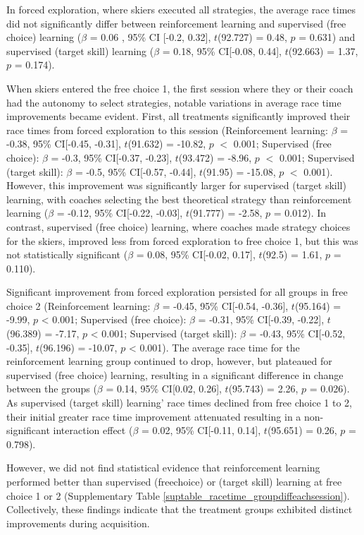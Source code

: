 \documentclass[pdflatex,sn-mathphys-num]{sn-jnl}%
\theoremstyle{thmstyleone}%
\theoremstyle{thmstyletwo}%
\theoremstyle{thmstylethree}%
\begin{document}
In forced exploration, where skiers executed all strategies, the average race times did not significantly differ between reinforcement learning and supervised (free choice) learning ($\beta$ = 0.06 , 95\% CI [-0.2, 0.32], $t$(92.727) = 0.48, $p$ = 0.631) and supervised (target skill) learning ($\beta$ = 0.18, 95\% CI[-0.08, 0.44], $t$(92.663) = 1.37, $p$ = 0.174). 

When skiers entered the free choice 1, the first session where they or their coach had the autonomy to select strategies, notable variations in average race time improvements became evident. First, all treatments significantly improved their race times from forced exploration to this session (Reinforcement learning: $\beta$ = -0.38, 95\% CI[-0.45, -0.31], $t$(91.632) = -10.82, $p$ $<$ 0.001; Supervised (free choice): $\beta$ = -0.3, 95\% CI[-0.37, -0.23], $t$(93.472) = -8.96, $p$ $<$ 0.001; Supervised (target skill): $\beta$ = -0.5, 95\% CI[-0.57, -0.44], $t$(91.95) = -15.08, $p$ $<$ 0.001). However, this improvement was significantly larger for supervised (target skill) learning, with coaches selecting the best theoretical strategy than reinforcement learning ($\beta$ = -0.12, 95\% CI[-0.22, -0.03], $t$(91.777) = -2.58, $p$ = 0.012). In contrast, supervised (free choice) learning, where coaches made strategy choices for the skiers, improved less from forced exploration to free choice 1, but this was not statistically significant ($\beta$ = 0.08, 95\% CI[-0.02, 0.17], $t$(92.5) = 1.61, $p$ = 0.110).

Significant improvement from forced exploration persisted for all groups in free choice 2 (Reinforcement learning: $\beta$ = -0.45, 95\% CI[-0.54, -0.36], $t$(95.164) = -9.99, $p$ < 0.001; Supervised (free choice): $\beta$ = -0.31, 95\% CI[-0.39, -0.22], $t$(96.389) = -7.17, $p$ < 0.001; Supervised (target skill): $\beta$ = -0.43, 95\% CI[-0.52, -0.35], $t$(96.196) = -10.07, $p$ < 0.001). The average race time for the reinforcement learning group continued to drop, however, but plateaued for supervised (free choice) learning, resulting in a significant difference in change between the groups ($\beta$ = 0.14, 95\% CI[0.02, 0.26], $t$(95.743) = 2.26, $p$ = 0.026). As supervised (target skill) learning' race times declined from free choice 1 to 2, their initial greater race time improvement attenuated resulting in a non-significant interaction effect ($\beta$ = 0.02, 95\% CI[-0.11, 0.14], $t$(95.651) = 0.26, $p$ = 0.798).

However, we did not find statistical evidence that reinforcement learning performed better than supervised (freechoice) or (target skill) learning at free choice 1 or 2 (Supplementary Table \ref{suptable_racetime_groupdiffeachsession}).
Collectively, these findings indicate that the treatment groups exhibited distinct improvements during acquisition.
\end{document}
